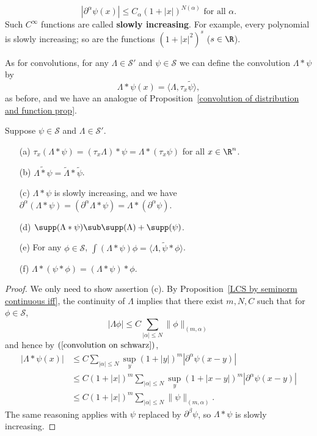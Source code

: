 \[|\partial^\alpha\psi(x)|\leq C_\alpha(1+|x|)^{N(\alpha)}\text{ for all $\alpha$}.\]
Such $C^\infty$ functions are called \textbf{slowly increasing}. For example, every polynomial is slowly increasing; so are the functions $(1+|x|^2)^s$ ($s\in\R$).\par
As for convolutions, for any $\Lambda\in\mathscr{S}'$ and $\psi\in\mathscr{S}$ we can define the convolution $\Lambda\ast\psi$ by
\[\Lambda\ast\psi(x)=\langle\Lambda,\tau_x\tilde{\psi}\rangle,\]
as before, and we have an analogue of Proposition~\ref{convolution of distribution and function prop}.
\begin{proposition}\label{convolution of tempered distribution prop}
Suppose $\psi\in\mathscr{S}$ and $\Lambda\in\mathscr{S}'$.
\begin{itemize}
\item[(a)] $\tau_x(\Lambda\ast\psi)=(\tau_x\Lambda)\ast\psi=\Lambda\ast(\tau_x\psi)$ for all $x\in\R^n$.
\item[(b)] $\widetilde{\Lambda\ast\psi}=\widetilde{\Lambda}\ast\tilde{\psi}$. 
\item[(c)] $\Lambda\ast\psi$ is slowly increasing, and we have $\partial^\alpha(\Lambda\ast\psi)=(\partial^\alpha\Lambda\ast\psi)=\Lambda\ast(\partial^\alpha\psi)$.
\item[(d)] $\supp(\Lambda\ast\psi)\sub\supp(\Lambda)+\supp(\psi)$. 
\item[(e)] For any $\phi\in\mathscr{S}$, $\int(\Lambda\ast\psi)\phi=\langle\Lambda,\tilde{\psi}\ast\phi\rangle$.
\item[(f)] $\Lambda\ast(\psi\ast\phi)=(\Lambda\ast\psi)\ast\phi$.  
\end{itemize}
\end{proposition}
\begin{proof}
We only need to show assertion (c). By Proposition~\ref{LCS by seminorm continuous iff}, the continuity of $\Lambda$ implies that there exist $m,N,C$ such that for $\phi\in\mathscr{S}$,
\[|\Lambda\phi|\leq C\sum_{|\alpha|\leq N}\|\phi\|_{(m,\alpha)}\]
and hence by $(\ref{convolution on schwarz})$, 
\begin{align*}
|\Lambda\ast\psi(x)|&\leq C\sum_{|\alpha|\leq N}\sup_y(1+|y|)^m|\partial^\alpha\psi(x-y)|\\
&\leq C(1+|x|)^m\sum_{|\alpha|\leq N}\sup_y(1+|x-y|)^m|\partial^\alpha\psi(x-y)|\\
&\leq C(1+|x|)^m\sum_{|\alpha|\leq N}\|\psi\|_{(m,\alpha)}.
\end{align*}
The same reasoning applies with $\psi$ replaced by $\partial^\beta\psi$, so $\Lambda\ast\psi$ is slowly increasing.
\end{proof}
